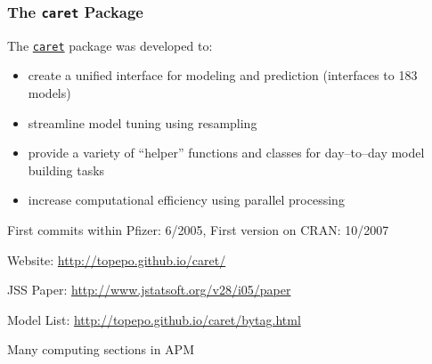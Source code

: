 \documentclass[12 pt]{beamer}\usepackage[]{graphicx}\usepackage[]{color}
\newcommand{\pkg}[1]{{\fontseries{b}\selectfont #1}}
\renewcommand{\pkg}[1]{{\color{darkgreen}\texttt{#1}}}
\begin{document}
  \begin{frame}[fragile]
\frametitle{The \pkg{caret} Package}

The \href{http://cran.r-project.org/web/packages/caret/index.html}{\pkg{caret}}  package was developed to:
  \begin{itemize}
\item create a unified interface for modeling and prediction
(interfaces to 183 models)
\item streamline model tuning using resampling
\item provide a variety of ``helper'' functions and classes for day--to--day model building tasks
\item increase computational efficiency using parallel processing
\end{itemize}

\vspace{.08in}

First commits within Pfizer: 6/2005, First version on CRAN: 10/2007

\vspace{.06in}

Website: \href{http://topepo.github.io/caret/}{http://topepo.github.io/caret/}

\vspace{.06in}

JSS Paper: \href{http://www.jstatsoft.org/v28/i05/paper}{http://www.jstatsoft.org/v28/i05/paper}

\vspace{.06in}

Model List: \href{http://topepo.github.io/caret/bytag.html}{http://topepo.github.io/caret/bytag.html}

\vspace{.06in}

Many computing sections in APM

\end{frame}

\end{document}
